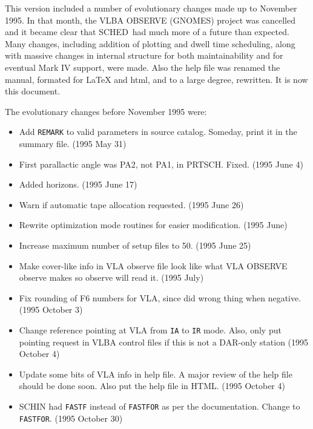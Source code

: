 \documentclass{report}
\newcommand{\schedb}{{\sc SCHED~}}
\begin{document}
This version included a number of evolutionary changes made up to
November 1995.  In that month, the {\sc VLBA OBSERVE (GNOMES)} project
was cancelled and it became clear that \schedb had much more of a future
than expected.  Many changes, including addition of plotting and dwell time
scheduling, along with massive changes in internal structure for both
maintainability and for eventual Mark IV support, were made.  Also
the help file was renamed the manual, formated for LaTeX and html, and
to a large degree, rewritten.  It is now this document.

The evolutionary changes before November 1995 were:

\begin{itemize}
\item Add {\tt REMARK} to valid parameters in source catalog. Someday,
      print it in the summary file. (1995 May 31)

\item First parallactic angle was PA2, not PA1, in PRTSCH. Fixed.
      (1995 June 4)

\item Added horizons. (1995 June 17)

\item Warn if automatic tape allocation requested. (1995 June 26)

\item Rewrite optimization mode routines for easier modification.
      (1995 June)

\item Increase maximum number of setup files to 50. (1995 June 25)

\item Make cover-like info in VLA observe file look like what
     {\sc VLA OBSERVE} observe makes so observe will read it.
     (1995 July)

\item Fix rounding of F6 numbers for VLA, since did wrong thing when
      negative. (1995 October 3)

\item Change reference pointing at VLA from {\tt IA} to {\tt IR}
      mode. Also, only put pointing request in VLBA control files if
      this is not a DAR-only station (1995 October 4)

\item Update some bits of VLA info in help file. A major review of the
      help file should be done soon. Also put the help file in HTML.
      (1995 October 4)

\item SCHIN had {\tt FASTF} instead of {\tt FASTFOR} as per the
      documentation. Change to {\tt FASTFOR}. (1995 October 30)
\end{itemize}
\end{document}
